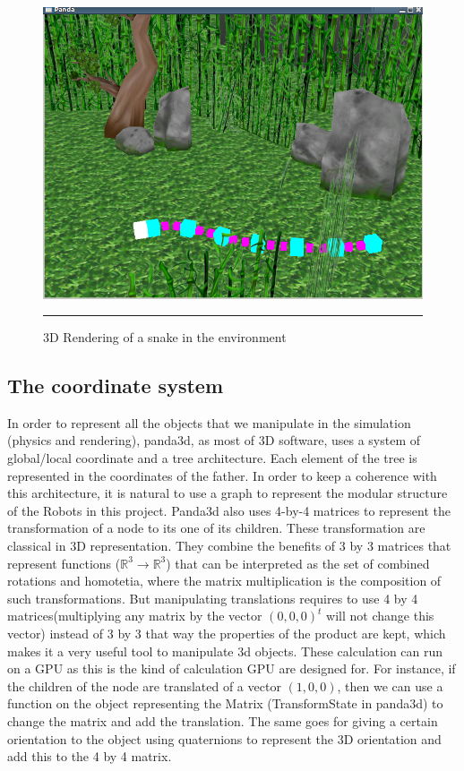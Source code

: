 \begin{figure}[htbp]
    \centering
    \includegraphics[scale=0.5]{Figures/snake.png}
    \rule{35em}{0.5pt}
    \caption[Simulated Snake in the environment]{3D Rendering of a snake in the environment}
    \label{fig:Snake}
\end{figure}



\subsection{The coordinate system}

In order to represent all the objects that we manipulate in the simulation (physics and rendering), panda3d, as most of 3D software, uses a system of global/local coordinate and a tree architecture. Each element of the tree is represented in the coordinates of the father. In order to keep a coherence with this architecture, it is natural to use a graph to represent the modular structure of the Robots in this project. Panda3d also uses 4-by-4 matrices to represent the transformation of a node to its one of its children. These transformation are classical in 3D representation. They combine the benefits of 3 by 3 matrices that represent functions ($\mathbb{R}^3 \to \mathbb{R}^3$) that can be interpreted as the set of combined rotations and homotetia, where the matrix multiplication is the composition of such transformations. But manipulating translations requires to use 4 by 4 matrices(multiplying any matrix by the vector $(0, 0, 0)^t$ will not change this vector) instead of 3 by 3 that way the properties of the product are kept, which makes it a very useful tool to manipulate 3d objects. These calculation can run on a GPU as this is the kind of calculation GPU are designed for.
For instance, if the children of the node are translated of a vector $(1, 0, 0)$, then we can use a function on the object representing the Matrix (TransformState in panda3d) to change the matrix and add the translation. The same goes for giving a certain orientation to the object using quaternions to represent the 3D orientation and add this to the 4 by 4 matrix.

